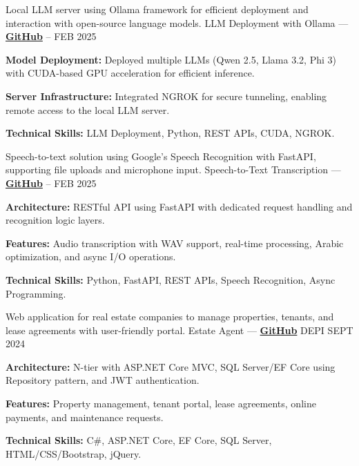 \begin{cventries}
\cventry
    {Local LLM server using Ollama framework for efficient deployment and interaction with open-source language models.} %
    {LLM Deployment with Ollama — \href{https://github.com/ibrhmahmd/spicy-avocado}{\color{midnightblue}\textbf{GitHub}} \textrm{\faArrowRight}} %
    {--} %
    {FEB 2025} %
    {
      \begin{cvitems} %
        \item \textbf{Model Deployment:}{ Deployed multiple LLMs (Qwen 2.5, Llama 3.2, Phi 3) with CUDA-based GPU acceleration for efficient inference.}
        \item \textbf{Server Infrastructure:}{ Integrated NGROK for secure tunneling, enabling remote access to the local LLM server.}
        \item \textbf{Technical Skills:}{ LLM Deployment, Python, REST APIs, CUDA, NGROK.}
      \end{cvitems}
    }

\cventry
    {Speech-to-text solution using Google's Speech Recognition with FastAPI, supporting file uploads and microphone input.} %
    {Speech-to-Text Transcription — \href{https://github.com/ibrhmahmd/audio-recognition}{\color{midnightblue}\textbf{GitHub}} \textrm{\faArrowRight}} %
    {--} %
    {FEB 2025} %
    {
      \begin{cvitems} %
        \item \textbf{Architecture:}{ RESTful API using FastAPI with dedicated request handling and recognition logic layers.}
        \item \textbf{Features:}{ Audio transcription with WAV support, real-time processing, Arabic optimization, and async I/O operations.}
        \item \textbf{Technical Skills:}{ Python, FastAPI, REST APIs, Speech Recognition, Async Programming.}
      \end{cvitems}
    }

\cventry
    {Web application for real estate companies to manage properties, tenants, and lease agreements with user-friendly portal.} %
    {Estate Agent — \href{https://github.com/ibrhmahmd/RealEstate}{\color{midnightblue}\textbf{GitHub}} \textrm{\faArrowRight}} %
    {DEPI} %
    {SEPT 2024} %
    {
      \begin{cvitems} %
        \item \textbf{Architecture:}{ N-tier with ASP.NET Core MVC, SQL Server/EF Core using Repository pattern, and JWT authentication.}
        \item \textbf{Features:}{ Property management, tenant portal, lease agreements, online payments, and maintenance requests.}
        \item \textbf{Technical Skills:}{ C#, ASP.NET Core, EF Core, SQL Server, HTML/CSS/Bootstrap, jQuery.}
      \end{cvitems}
    }


\end{cventries}
